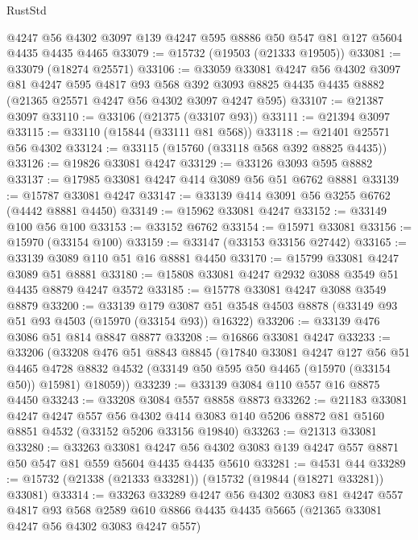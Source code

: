 \begin{lexlean}{RustStd}
\begin{coremodule}
    @4247
    @56
    @4302
    @3097
    @139
    @4247
    @595
    @8886
    @50
    @547
    @81
    @127
    @5604
    @4435
    @4435
    @4465
@33079 := @15732 (@19503 (@21333 @19505))
@33081 := @33079 (@18274 @25571)
@33106 := @33059
    @33081
    @4247
    @56
    @4302
    @3097
    @81
    @4247
    @595
    @4817
    @93
    @568
    @392
    @3093
    @8825
    @4435
    @4435
    @8882
    (@21365 @25571 @4247 @56 @4302 @3097 @4247 @595)
@33107 := @21387 @3097
@33110 := @33106 (@21375 (@33107 @93))
@33111 := @21394 @3097
@33115 := @33110 (@15844 (@33111 @81 @568))
@33118 := @21401 @25571 @56 @4302
@33124 := @33115 (@15760 (@33118 @568 @392 @8825 @4435))
@33126 := @19826 @33081 @4247
@33129 := @33126 @3093 @595 @8882
@33137 := @17985 @33081 @4247 @414 @3089 @56 @51 @6762 @8881
@33139 := @15787 @33081 @4247
@33147 := @33139 @414 @3091 @56 @3255 @6762 (@4442 @8881 @4450)
@33149 := @15962 @33081 @4247
@33152 := @33149 @100 @56 @100
@33153 := @33152 @6762
@33154 := @15971 @33081
@33156 := @15970 (@33154 @100)
@33159 := @33147 (@33153 @33156 @27442)
@33165 := @33139 @3089 @110 @51 @16 @8881 @4450
@33170 := @15799 @33081 @4247 @3089 @51 @8881
@33180 := @15808 @33081 @4247 @2932 @3088 @3549 @51 @4435 @8879 @4247 @3572
@33185 := @15778 @33081 @4247 @3088 @3549 @8879
@33200 := @33139
    @179
    @3087
    @51
    @3548
    @4503
    @8878
    (@33149 @93 @51 @93 @4503 (@15970 (@33154 @93)) @16322)
@33206 := @33139 @476 @3086 @51 @814 @8847 @8877
@33208 := @16866 @33081 @4247
@33233 := @33206
    (@33208
      @476
      @51
      @8843
      @8845
      (@17840
        @33081
        @4247
        @127
        @56
        @51
        @4465
        @4728
        @8832
        @4532
        (@33149 @50 @595 @50 @4465 (@15970 (@33154 @50)) @15981)
        @18059))
@33239 := @33139 @3084 @110 @557 @16 @8875 @4450
@33243 := @33208 @3084 @557 @8858 @8873
@33262 := @21183
    @33081
    @4247
    @4247
    @557
    @56
    @4302
    @414
    @3083
    @140
    @5206
    @8872
    @81
    @5160
    @8851
    @4532
    (@33152 @5206 @33156 @19840)
@33263 := @21313 @33081
@33280 := @33263
    @33081
    @4247
    @56
    @4302
    @3083
    @139
    @4247
    @557
    @8871
    @50
    @547
    @81
    @559
    @5604
    @4435
    @4435
    @5610
@33281 := @4531 @44
@33289 := @15732 (@21338 (@21333 @33281)) (@15732 (@19844 (@18271 @33281)) @33081)
@33314 := @33263
    @33289
    @4247
    @56
    @4302
    @3083
    @81
    @4247
    @557
    @4817
    @93
    @568
    @2589
    @610
    @8866
    @4435
    @4435
    @5665
    (@21365 @33081 @4247 @56 @4302 @3083 @4247 @557)

\end{coremodule}
\end{lexlean}

